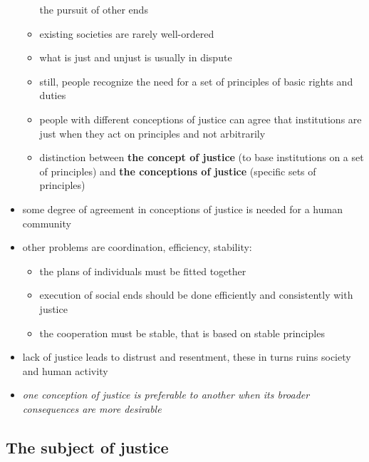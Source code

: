 \begin{itemize}
\begin{itemize}
		the pursuit of other ends
		\item existing societies are rarely well-ordered
		\item what is just and unjust is usually in dispute
		\item still, people recognize the need for a set of principles
		of basic rights and duties
		\item people with different conceptions of justice can agree
		that institutions are just when they act on principles and not
		arbitrarily
		\item distinction between \textbf{the concept of justice}
		(to base institutions on a set of principles) and \textbf{the
		conceptions of justice} (specific sets of principles)
	\end{itemize}
	\item some degree of agreement in conceptions of justice is needed for
	a human community
	\item other problems are coordination, efficiency, stability:
	\begin{itemize}
		\item the plans of individuals must be fitted together
		\item execution of social ends should be done efficiently and
		consistently with justice
		\item the cooperation must be stable, that is based on stable
		principles
	\end{itemize}
	\item lack of justice leads to distrust and resentment, these in turns
	ruins society and human activity
	\item \textit{one conception of justice is preferable to another when
	its broader consequences are more desirable}
\end{itemize}

\subsection{The subject of justice}

